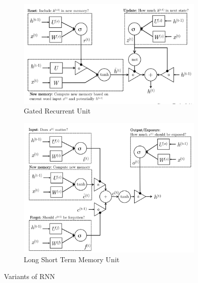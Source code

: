 \documentclass{article}
\begin{document}
\begin{appendices}
	\begin{figure}
		\centering
		\begin{subfigure}{0.4\textwidth}
			\label{fig:gru}
			\centering
			\includegraphics[width=1\textwidth]{fig/gru.png}
			\caption{Gated Recurrent Unit}
		\end{subfigure}
		\hspace*{\fill} %
		\begin{subfigure}{0.4\textwidth}
			\label{fig:lstm}
			\centering
			\includegraphics[width=1\textwidth]{fig/lstm.png}
			\caption{Long Short Term Memory Unit}
		\end{subfigure}
		\caption{Variants of RNN}
		\label{fig:rnna}
	\end{figure}

\end{appendices}
\end{document}
